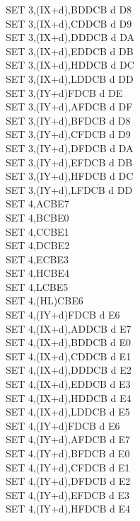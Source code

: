 \begin{multicols}{3}
{\begin{tabbing}
		SET 3,(IX+d),B\UNDOC\>DDCB d D8\\
		SET 3,(IX+d),C\UNDOC\>DDCB d D9\\
		SET 3,(IX+d),D\UNDOC\>DDCB d DA\\
		SET 3,(IX+d),E\UNDOC\>DDCB d DB\\
		SET 3,(IX+d),H\UNDOC\>DDCB d DC\\
		SET 3,(IX+d),L\UNDOC\>DDCB d DD\\
		SET 3,(IY+d)\>FDCB d DE\\
		SET 3,(IY+d),A\UNDOC\>FDCB d DF\\
		SET 3,(IY+d),B\UNDOC\>FDCB d D8\\
		SET 3,(IY+d),C\UNDOC\>FDCB d D9\\
		SET 3,(IY+d),D\UNDOC\>FDCB d DA\\
		SET 3,(IY+d),E\UNDOC\>FDCB d DB\\
		SET 3,(IY+d),H\UNDOC\>FDCB d DC\\
		SET 3,(IY+d),L\UNDOC\>FDCB d DD\\
		SET 4,A\>CBE7\\
		SET 4,B\>CBE0\\
		SET 4,C\>CBE1\\
		SET 4,D\>CBE2\\
		SET 4,E\>CBE3\\
		SET 4,H\>CBE4\\
		SET 4,L\>CBE5\\
		SET 4,(HL)\>CBE6\\
		SET 4,(IY+d)\>FDCB d E6\\
		SET 4,(IX+d),A\UNDOC\>DDCB d E7\\
		SET 4,(IX+d),B\UNDOC\>DDCB d E0\\
		SET 4,(IX+d),C\UNDOC\>DDCB d E1\\
		SET 4,(IX+d),D\UNDOC\>DDCB d E2\\
		SET 4,(IX+d),E\UNDOC\>DDCB d E3\\
		SET 4,(IX+d),H\UNDOC\>DDCB d E4\\
		SET 4,(IX+d),L\UNDOC\>DDCB d E5\\
		SET 4,(IY+d)\>FDCB d E6\\
		SET 4,(IY+d),A\UNDOC\>FDCB d E7\\
		SET 4,(IY+d),B\UNDOC\>FDCB d E0\\
		SET 4,(IY+d),C\UNDOC\>FDCB d E1\\
		SET 4,(IY+d),D\UNDOC\>FDCB d E2\\
		SET 4,(IY+d),E\UNDOC\>FDCB d E3\\
		SET 4,(IY+d),H\UNDOC\>FDCB d E4\\

\end{tabbing}}
\end{multicols}

